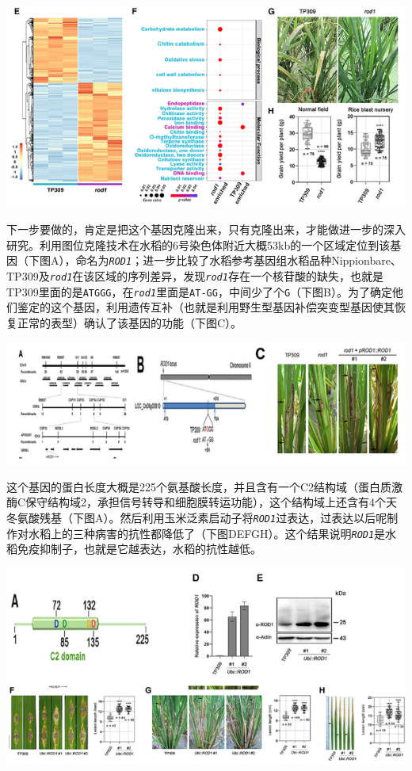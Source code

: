 \documentclass[
  10pt,
]{book}
\begin{document}
\includegraphics{figures/HeZuhuaCell2021/2.png}

下一步要做的，肯定是把这个基因克隆出来，只有克隆出来，才能做进一步的深入研究。利用图位克隆技术在水稻的6号染色体附近大概53kb的一个区域定位到该基因（下图A），命名为\emph{\texttt{ROD1}}；进一步比较了水稻参考基因组水稻品种Nippionbare、TP309及\emph{\texttt{rod1}}在该区域的序列差异，发现\emph{\texttt{rod1}}存在一个核苷酸的缺失，也就是TP309里面的是\texttt{ATGGG}，在\emph{\texttt{rod1}}里面是\texttt{AT-GG}，中间少了个\texttt{G}（下图B）。为了确定他们鉴定的这个基因，利用遗传互补（也就是利用野生型基因补偿突变型基因使其恢复正常的表型）确认了该基因的功能（下图C）。

\includegraphics{figures/HeZuhuaCell2021/3.png}

这个基因的蛋白长度大概是225个氨基酸长度，并且含有一个C2结构域（蛋白质激酶C保守结构域2，承担信号转导和细胞膜转运功能），这个结构域上还含有4个天冬氨酸残基（下图A）。然后利用玉米泛素启动子将\emph{\texttt{ROD1}}过表达，过表达以后呢制作对水稻上的三种病害的抗性都降低了（下图DEFGH）。这个结果说明\emph{\texttt{ROD1}}是水稻免疫抑制子，也就是它越表达，水稻的抗性越低。

\includegraphics{figures/HeZuhuaCell2021/4.png}
\end{document}
